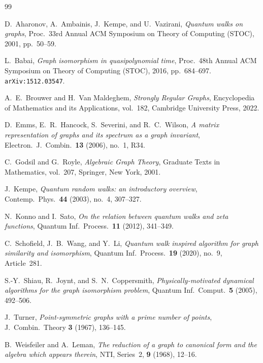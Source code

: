 \documentclass[12pt]{article}
\begin{document}
\begin{thebibliography}{99}

D.~Aharonov, A.~Ambainis, J.~Kempe, and U.~Vazirani,
\emph{Quantum walks on graphs},
Proc.\ 33rd Annual ACM Symposium on Theory of Computing (STOC),
2001, pp.~50--59.

L.~Babai,
\emph{Graph isomorphism in quasipolynomial time},
Proc.\ 48th Annual ACM Symposium on Theory of Computing (STOC),
2016, pp.~684--697.
\texttt{arXiv:1512.03547}.

A.~E.~Brouwer and H.~Van Maldeghem,
\emph{Strongly Regular Graphs},
Encyclopedia of Mathematics and its Applications, vol.~182,
Cambridge University Press, 2022.

D.~Emms, E.~R.~Hancock, S.~Severini, and R.~C.~Wilson,
\emph{A matrix representation of graphs and its spectrum as a graph
  invariant},
Electron.\ J.\ Combin.\ \textbf{13} (2006), no.~1, R34.

C.~Godsil and G.~Royle,
\emph{Algebraic Graph Theory},
Graduate Texts in Mathematics, vol.~207, Springer, New York, 2001.

J.~Kempe,
\emph{Quantum random walks: an introductory overview},
Contemp.\ Phys.\ \textbf{44} (2003), no.~4, 307--327.

N.~Konno and I.~Sato,
\emph{On the relation between quantum walks and zeta functions},
Quantum Inf.\ Process.\ \textbf{11} (2012), 341--349.

C.~Schofield, J.~B.~Wang, and Y.~Li,
\emph{Quantum walk inspired algorithm for graph similarity and isomorphism},
Quantum Inf.\ Process.\ \textbf{19} (2020), no.~9, Article~281.

S.-Y.~Shiau, R.~Joynt, and S.~N.~Coppersmith,
\emph{Physically-motivated dynamical algorithms for the graph isomorphism
  problem},
Quantum Inf.\ Comput.\ \textbf{5} (2005), 492--506.

J.~Turner,
\emph{Point-symmetric graphs with a prime number of points},
J.\ Combin.\ Theory \textbf{3} (1967), 136--145.

B.~Weisfeiler and A.~Leman,
\emph{The reduction of a graph to canonical form and the algebra which
  appears therein},
NTI, Series~2, \textbf{9} (1968), 12--16.

\end{thebibliography}
\end{document}
